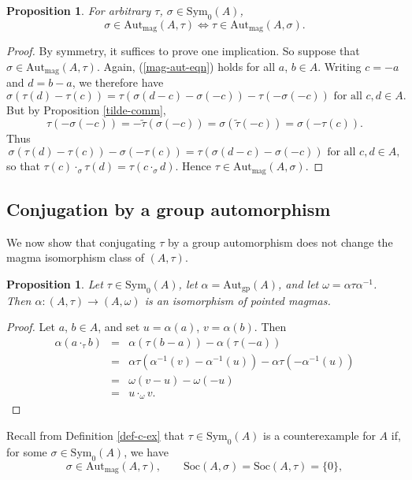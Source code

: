 \documentclass[letterpaper,12pt]{amsart}
\numberwithin{equation}{section}
\numberwithin{algorithm}{section}
\newtheorem{proposition}[lemma]{Proposition}
\theoremstyle{definition}
\newcommand{\LRA}{\Leftrightarrow}
\newcommand{\Soc}{\mathrm{Soc}}
\newcommand{\Autgp}{\mathrm{Aut}_{\mathrm{gp}}}
\newcommand{\Autmag}{\mathrm{Aut}_\mathrm{mag}}
\newcommand{\Symo}{\mathrm{Sym}_0}
\newcommand{\ttau}{\tilde{\tau}}
\begin{document}
\begin{proposition} \label{recip}
For arbitrary $\tau$, $\sigma \in \Symo(A)$, 
$$ \sigma \in \Autmag(A,\tau) \LRA \tau \in \Autmag(A,\sigma). $$
\end{proposition}
\begin{proof}
By symmetry, it suffices to prove one implication. So suppose that $\sigma \in \Autmag(A,\tau)$. Again, (\ref{mag-aut-eqn}) holds for all $a$, $b \in A$. Writing $c=-a$ and $d=b-a$, we therefore have
\begin{equation} \label{mag-autom1}
	\sigma( \tau(d) - \tau(c)) = \tau(\sigma(d-c)-\sigma(-c)) - \tau( -
	\sigma(-c))	\mbox{ for all } c, d \in A. 
\end{equation}
But by Proposition \ref{tilde-comm}, 
$$ \tau(-\sigma(-c)) = -\ttau(\sigma(-c)) = \sigma(\ttau(-c)) = \sigma(-\tau(c)).$$
Thus 
$$ \sigma( \tau(d) - \tau(c)) - \sigma(-\tau(c)) = \tau(\sigma(d-c)-\sigma(-c)) 
\mbox{ for all } c, d \in A, $$
so that $\tau(c) \cdot_\sigma \tau(d) = \tau(c
\cdot_\sigma d)$. Hence $\tau \in \Autmag(A,\sigma)$.	
\end{proof}

\subsection{Conjugation by a group automorphism}
We now show that conjugating $\tau$ by a group automorphism does not change the magma
isomorphism class of $(A,\tau)$.

\begin{proposition}  \label{conjug}
Let $\tau \in \Symo(A)$, let $\alpha=\Autgp(A)$, and let $\omega=\alpha \tau \alpha^{-1}$. Then $\alpha: (A,\tau) \to (A,\omega)$ is an isomorphism of pointed magmas.
\end{proposition}
\begin{proof}
Let $a$, $b \in A$, and set $u=\alpha(a)$, $v=\alpha(b)$. Then 
\begin{eqnarray*} 
 \alpha(a \cdot_\tau b) & = & \alpha(\tau(b-a))-\alpha(\tau(-a)) \\
					  & = & \alpha \tau (\alpha^{-1}(v) -\alpha^{-1}(u) ) - \alpha \tau(-\alpha^{-1}(u)) \\
                      & = & \omega(v-u) - \omega(-u) \\
                      & = & u \cdot_\omega v.
\end{eqnarray*} 
\end{proof}

Recall from Definition \ref{def-c-ex} that $\tau \in \Symo(A)$ is a counterexample for $A$ if, for some $\sigma \in \Symo(A)$, we have 
\begin{equation} \label{st-conds}
	\sigma \in \Autmag(A,\tau), \qquad \Soc(A,\sigma) = \Soc(A,\tau) = \{0\}, 
\end{equation}
\end{document}

